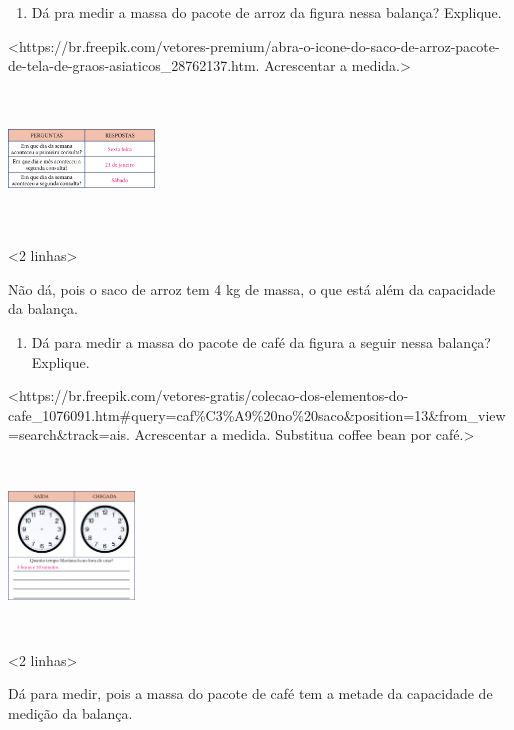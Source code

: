 {\begin{enumerate}
\def\labelenumi{\alph{enumi})}
\item
  Dá pra medir a massa do pacote de arroz da figura nessa
  balança? Explique.
\end{enumerate}

\textless{}https://br.freepik.com/vetores-premium/abra-o-icone-do-saco-de-arroz-pacote-de-tela-de-graos-asiaticos\_28762137.htm.
Acrescentar a medida.\textgreater{}

\includegraphics[width=1.53125in,height=1.43597in]{media/image53.png}

\textless{}2 linhas\textgreater{}

Não dá, pois o saco de arroz tem 4 kg de massa, o que está além da capacidade da balança.

\begin{enumerate}
\def\labelenumi{\alph{enumi})}
\item
  Dá para medir a massa do pacote de café da figura a seguir nessa
  balança? Explique.
\end{enumerate}

\textless{}https://br.freepik.com/vetores-gratis/colecao-dos-elementos-do-cafe\_1076091.htm\#query=caf\%C3\%A9\%20no\%20saco\&position=13\&from\_view=search\&track=ais.
Acrescentar a medida. Substitua coffee bean por café.\textgreater{}

\includegraphics[width=1.32094in,height=1.80208in]{media/image54.png}

\textless{}2 linhas\textgreater{}

Dá para medir, pois a massa do pacote de café tem a metade da capacidade
de medição da balança.

}
